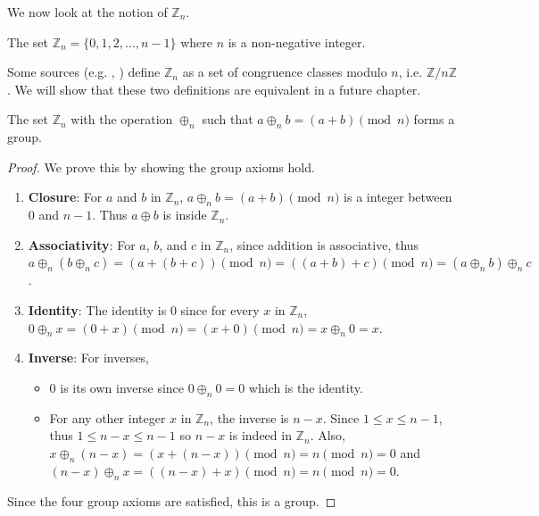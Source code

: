 We now look at the notion of $\mathbb{Z}_n$.
\begin{definition}
    The set $\mathbb{Z}_n = \{0, 1, 2, \dots, n-1\}$ where $n$ is a non-negative integer.
\end{definition}
\begin{remark}
    Some sources (e.g. \cite{clark_1984}, \cite{humphreys_1996}) define $\mathbb{Z}_n$ as a set of congruence classes modulo $n$, i.e. $\mathbb{Z}/n\mathbb{Z}$. We will show that these two definitions are equivalent in a future chapter.
\end{remark}
\begin{proposition}
    The set $\mathbb{Z}_n$ with the operation $\oplus_n$ such that $a \oplus_n b = (a + b) \pmod{n}$ forms a group.
\end{proposition}
\begin{proof}
    We prove this by showing the group axioms hold.
    \begin{enumerate}
        \item \textbf{Closure}: For $a$ and $b$ in $\mathbb{Z}_n$, $a \oplus_n b = (a + b) \pmod{n}$ is a integer between 0 and $n - 1$. Thus $a \oplus b$ is inside $\mathbb{Z}_n$.
        \item \textbf{Associativity}: For $a$, $b$, and $c$ in $\mathbb{Z}_n$, since addition is associative, thus $a \oplus_n (b \oplus_n c) = (a + (b + c)) \pmod{n} = ((a + b) + c) \pmod{n} = (a \oplus_n b) \oplus_n c$.
        \item \textbf{Identity}: The identity is $0$ since for every $x$ in $\mathbb{Z}_n$, $0 \oplus_n x = (0 + x) \pmod{n} = (x + 0) \pmod{n} = x \oplus_n 0 = x$.
        \item \textbf{Inverse}: For inverses, \begin{itemize}
            \item $0$ is its own inverse since $0 \oplus_n 0 = 0$ which is the identity.
            \item For any other integer $x$ in $\mathbb{Z}_n$, the inverse is $n - x$. Since $1 \leq x \leq n - 1$, thus $1 \leq n - x \leq n - 1$ so $n - x$ is indeed in $\mathbb{Z}_n$. Also, $x \oplus_n (n - x) = (x + (n - x)) \pmod{n} = n \pmod{n} = 0$ and $(n - x) \oplus_n x = ((n-x) + x)\pmod{n} = n \pmod{n} = 0$.
        \end{itemize}
    \end{enumerate}
    Since the four group axioms are satisfied, this is a group.
\end{proof}

